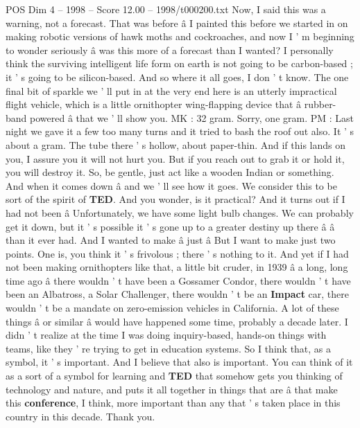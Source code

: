 \begin{textsample}{POS Dim 4 – 1998 – Score 12.00 – 1998/t000200.txt}
Now, I said this was a warning, not a forecast.
That was before â I painted this before we started in on making robotic versions of hawk moths and cockroaches, and now I ' m beginning to wonder seriously â was this more of a forecast than I wanted?
I personally think the surviving intelligent life form on earth is not going to be carbon-based ; it ' s going to be silicon-based.
And so where it all goes, I don ' t know.
The one final bit of sparkle we ' ll put in at the very end here is an utterly impractical flight vehicle, which is a little ornithopter wing-flapping device that â rubber-band powered â that we ' ll show you.
MK : 32 gram.
Sorry, one gram.
PM : Last night we gave it a few too many turns and it tried to bash the roof out also.
It ' s about a gram.
The tube there ' s hollow, about paper-thin.
And if this lands on you, I assure you it will not hurt you.
But if you reach out to grab it or hold it, you will destroy it.
So, be gentle, just act like a wooden Indian or something.
And when it comes down â and we ' ll see how it goes.
We consider this to be sort of the spirit of \textbf{TED}.
And you wonder, is it practical?
And it turns out if I had not been â Unfortunately, we have some light bulb changes.
We can probably get it down, but it ' s possible it ' s gone up to a greater destiny up there â â than it ever had.
And I wanted to make â just â But I want to make just two points.
One is, you think it ' s frivolous ; there ' s nothing to it.
And yet if I had not been making ornithopters like that, a little bit cruder, in 1939 â a long, long time ago â there wouldn ' t have been a Gossamer Condor, there wouldn ' t have been an Albatross, a Solar Challenger, there wouldn ' t be an \textbf{Impact} car, there wouldn ' t be a mandate on zero-emission vehicles in California.
A lot of these things â or similar â would have happened some time, probably a decade later.
I didn ' t realize at the time I was doing inquiry-based, hands-on things with teams, like they ' re trying to get in education systems.
So I think that, as a symbol, it ' s important.
And I believe that also is important.
You can think of it as a sort of a symbol for learning and \textbf{TED} that somehow gets you thinking of technology and nature, and puts it all together in things that are â that make this \textbf{conference}, I think, more important than any that ' s taken place in this country in this decade.
Thank you.

\end{textsample}
